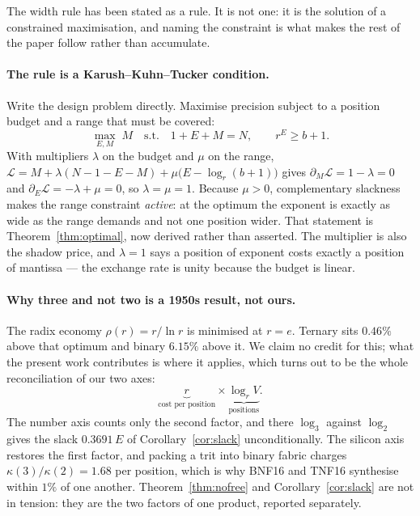 \documentclass[11pt]{article}
\theoremstyle{definition}
\begin{document}
The width rule has been stated as a rule. It is not one: it is the solution of a
constrained maximisation, and naming the constraint is what makes the rest of the
paper follow rather than accumulate.

\paragraph{The rule is a Karush--Kuhn--Tucker condition.} Write the design problem
directly. Maximise precision subject to a position budget and a range that must be
covered:
\[
  \max_{E,M} \; M
  \quad\text{s.t.}\quad
  1 + E + M = N,
  \qquad
  r^{E} \ge b+1 .
\]
With multipliers $\lambda$ on the budget and $\mu$ on the range,
$\mathcal{L} = M + \lambda(N-1-E-M) + \mu\bigl(E - \log_r(b+1)\bigr)$ gives
$\partial_M \mathcal{L} = 1-\lambda = 0$ and $\partial_E \mathcal{L} = -\lambda+\mu = 0$,
so $\lambda = \mu = 1$. Because $\mu > 0$, complementary slackness makes the range
constraint \emph{active}: at the optimum the exponent is exactly as wide as the
range demands and not one position wider. That statement is
Theorem~\ref{thm:optimal}, now derived rather than asserted. The multiplier is
also the shadow price, and $\lambda = 1$ says a position of exponent costs exactly
a position of mantissa --- the exchange rate is unity because the budget is linear.

\paragraph{Why three and not two is a 1950s result, not ours.} The radix economy
$\rho(r) = r/\ln r$ is minimised at $r = e$. Ternary sits $0.46\%$ above that
optimum and binary $6.15\%$ above it. We claim no credit for this; what the present
work contributes is where it applies, which turns out to be the whole
reconciliation of our two axes:
\[
  \underbrace{r}_{\text{cost per position}} \times \underbrace{\log_r V}_{\text{positions}} .
\]
The number axis counts only the second factor, and there $\log_3$ against $\log_2$
gives the slack $0.3691\,E$ of Corollary~\ref{cor:slack} unconditionally. The
silicon axis restores the first factor, and packing a trit into binary fabric
charges $\kappa(3)/\kappa(2) = 1.68$ per position, which is why BNF16 and TNF16
synthesise within $1\%$ of one another. Theorem~\ref{thm:nofree} and
Corollary~\ref{cor:slack} are not in tension: they are the two factors of one
product, reported separately.
\end{document}
